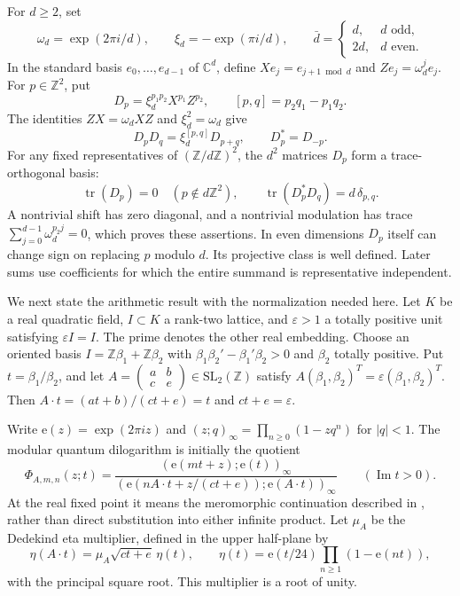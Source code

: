 \documentclass[11pt]{article}
\newcommand{\C}{\mathbb C}
\newcommand{\Z}{\mathbb Z}
\newcommand{\tr}{\operatorname{tr}}
\newcommand{\e}{\mathrm e}
\begin{document}
For $d\geq2$, set
\[
 \omega_d=\exp(2\pi i/d),\qquad
 \xi_d=-\exp(\pi i/d),\qquad
 \bar d=\begin{cases}d,&d\text{ odd},\\2d,&d\text{ even}.\end{cases}
\]
In the standard basis $e_0,\ldots,e_{d-1}$ of $\C^d$, define
$Xe_j=e_{j+1\bmod d}$ and $Ze_j=\omega_d^j e_j$. For $p\in\Z^2$, put
\begin{equation}
\label{eq:displacement}
 D_p=\xi_d^{p_1p_2}X^{p_1}Z^{p_2},\qquad
 [p,q]=p_2q_1-p_1q_2.
\end{equation}
The identities $ZX=\omega_dXZ$ and $\xi_d^2=\omega_d$ give
\begin{equation}
\label{eq:weyl}
 D_pD_q=\xi_d^{[p,q]}D_{p+q},\qquad D_p^*=D_{-p}.
\end{equation}
For any fixed representatives of $(\Z/d\Z)^2$, the $d^2$ matrices $D_p$
form a trace-orthogonal basis:
\begin{equation}
\label{eq:trace}
 \tr(D_p)=0\quad(p\notin d\Z^2),\qquad
 \tr(D_p^*D_q)=d\,\delta_{p,q}.
\end{equation}
A nontrivial shift has zero diagonal, and a nontrivial modulation has trace
$\sum_{j=0}^{d-1}\omega_d^{p_2j}=0$, which proves these assertions.
In even dimensions $D_p$ itself can change sign on replacing $p$ modulo $d$.
Its projective class is well defined. Later sums use coefficients for which
the entire summand is representative independent.

We next state the arithmetic result with the normalization needed here.
Let $K$ be a real quadratic field, $I\subset K$ a rank-two lattice, and
$\varepsilon>1$ a totally positive unit satisfying $\varepsilon I=I$.
The prime denotes the other real embedding. Choose an oriented basis
$I=\Z\beta_1+\Z\beta_2$ with
$\beta_1\beta_2'-\beta_1'\beta_2>0$ and $\beta_2$ totally positive.
Put $t=\beta_1/\beta_2$, and let
$A=\left(\begin{smallmatrix}a&b\\c&e\end{smallmatrix}\right)\in
\mathrm{SL}_2(\Z)$ satisfy
$A(\beta_1,\beta_2)^T=\varepsilon(\beta_1,\beta_2)^T$.
Then $A\cdot t=(at+b)/(ct+e)=t$ and $ct+e=\varepsilon$.

Write $\e(z)=\exp(2\pi iz)$ and
$(z;q)_\infty=\prod_{n\geq0}(1-zq^n)$ for $|q|<1$.
The modular quantum dilogarithm is initially the quotient
\begin{equation}
\label{eq:phi}
 \Phi_{A,m,n}(z;t)=
 \frac{(\e(mt+z);\e(t))_\infty}
 {(\e(nA\cdot t+z/(ct+e));\e(A\cdot t))_\infty}
 \qquad(\operatorname{Im}t>0).
\end{equation}
At the real fixed point it means the meromorphic continuation described in
\cite[Section~2.2]{RW26}, rather than direct substitution into either infinite
product. Let $\mu_A$ be the Dedekind eta multiplier, defined in the upper
half-plane by
\[
 \eta(A\cdot t)=\mu_A\sqrt{ct+e}\,\eta(t),\qquad
 \eta(t)=\e(t/24)\prod_{n\geq1}(1-\e(nt)),
\]
with the principal square root. This multiplier is a root of unity.
\end{document}

